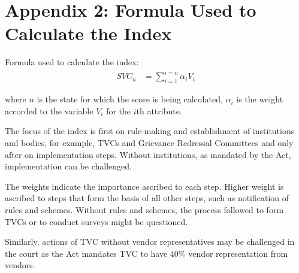 \documentclass[a4paper, 12pt, twoside]{article}
\begin{document}
{{\section*{Appendix 2: Formula Used to Calculate the Index}
\label{sec: Appendix 2}
Formula used to calculate the index:
\begin{align*}
SVC_n &= \sum_{i = 1}^{i = n} \alpha_i V_i
\end{align*}

where $n$ is the state for which the score is being calculated, $\alpha_i$ is the weight accorded to the variable $V_i$ for the $i$th attribute.

The focus of the index is first on rule-making and establishment of institutions and bodies, for example, TVCs and Grievance Redressal Committees and only after on implementation steps. Without institutions, as mandated by the Act, implementation can be challenged.

The weights indicate the importance ascribed to each step. Higher weight is ascribed to steps that form the basis of all other steps, such as notification of rules and schemes. Without rules and schemes, the process followed to form TVCs or to conduct surveys might be questioned.

Similarly, actions of TVC without vendor representatives may be challenged in the court as the Act mandates TVC to have 40\% vendor representation from vendors.

}}
\end{document}
